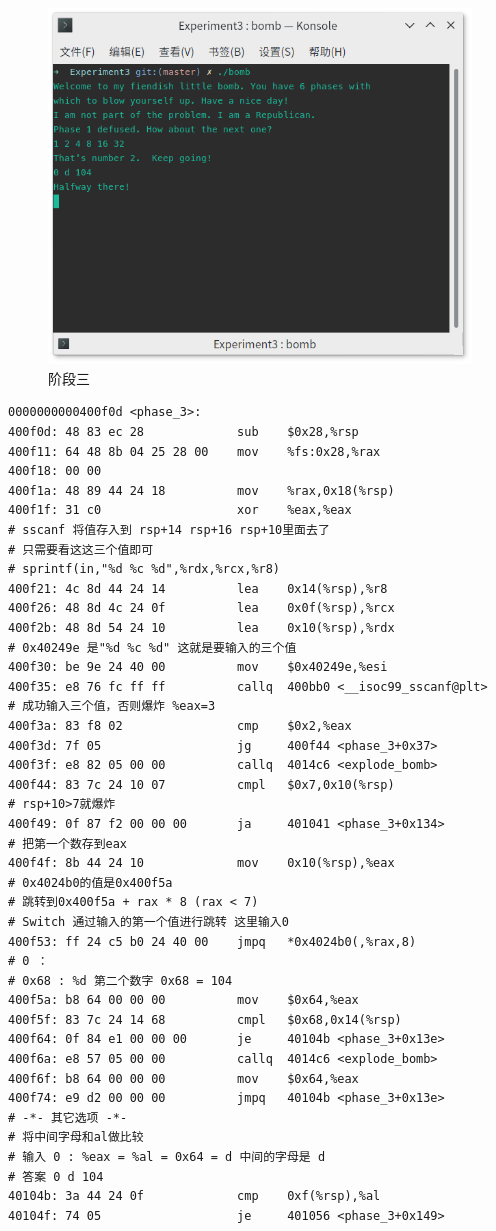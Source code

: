 \begin{figure}[H]
\begin{minipage}[c]{0.4\linewidth}
\centering
\includegraphics[width=\linewidth]{figures/Bomb-3}
\caption{阶段三}
\label{fig:bomb-3}
\end{minipage}
\end{figure}

\begin{lstlisting}
0000000000400f0d <phase_3>:
400f0d:	48 83 ec 28          	sub    $0x28,%rsp
400f11:	64 48 8b 04 25 28 00 	mov    %fs:0x28,%rax
400f18:	00 00 
400f1a:	48 89 44 24 18       	mov    %rax,0x18(%rsp)
400f1f:	31 c0                	xor    %eax,%eax
# sscanf 将值存入到 rsp+14 rsp+16 rsp+10里面去了
# 只需要看这这三个值即可
# sprintf(in,"%d %c %d",%rdx,%rcx,%r8)
400f21:	4c 8d 44 24 14       	lea    0x14(%rsp),%r8
400f26:	48 8d 4c 24 0f       	lea    0x0f(%rsp),%rcx
400f2b:	48 8d 54 24 10       	lea    0x10(%rsp),%rdx
# 0x40249e 是"%d %c %d" 这就是要输入的三个值
400f30:	be 9e 24 40 00       	mov    $0x40249e,%esi
400f35:	e8 76 fc ff ff       	callq  400bb0 <__isoc99_sscanf@plt>
# 成功输入三个值，否则爆炸 %eax=3
400f3a:	83 f8 02             	cmp    $0x2,%eax
400f3d:	7f 05                	jg     400f44 <phase_3+0x37>
400f3f:	e8 82 05 00 00       	callq  4014c6 <explode_bomb>
400f44:	83 7c 24 10 07       	cmpl   $0x7,0x10(%rsp)
# rsp+10>7就爆炸
400f49:	0f 87 f2 00 00 00    	ja     401041 <phase_3+0x134>
# 把第一个数存到eax
400f4f:	8b 44 24 10          	mov    0x10(%rsp),%eax
# 0x4024b0的值是0x400f5a 
# 跳转到0x400f5a + rax * 8 (rax < 7)
# Switch 通过输入的第一个值进行跳转 这里输入0
400f53:	ff 24 c5 b0 24 40 00 	jmpq   *0x4024b0(,%rax,8)
# 0 ：
# 0x68 : %d 第二个数字 0x68 = 104
400f5a:	b8 64 00 00 00       	mov    $0x64,%eax
400f5f:	83 7c 24 14 68       	cmpl   $0x68,0x14(%rsp)
400f64:	0f 84 e1 00 00 00    	je     40104b <phase_3+0x13e>
400f6a:	e8 57 05 00 00       	callq  4014c6 <explode_bomb>
400f6f:	b8 64 00 00 00       	mov    $0x64,%eax
400f74:	e9 d2 00 00 00       	jmpq   40104b <phase_3+0x13e>
# -*- 其它选项 -*-
# 将中间字母和al做比较
# 输入 0 : %eax = %al = 0x64 = d 中间的字母是 d
# 答案 0 d 104
40104b:	3a 44 24 0f          	cmp    0xf(%rsp),%al
40104f:	74 05                	je     401056 <phase_3+0x149>
\end{lstlisting}

